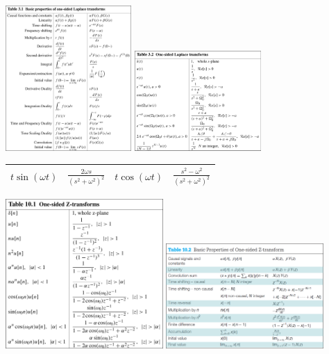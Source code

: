 \documentclass[12pt,landscape,letterpaper]{article}
\begin{document}
\begin{multicols*}{2}
	\includegraphics[width=0.36\textwidth]{laplace-properties}
	\includegraphics[width=0.36\textwidth]{laplace-pairs}
	\begin{tabular}{|c c|c c|}
		\hline
		$t\sin(\omega t)$ & $\frac{2\omega s}{(s^2 + \omega ^2)^2}$ & $t\cos(\omega t)$ & $\frac{s^2 - \omega ^2}{(s^2 + \omega ^2)^2}$\\
		\hline
	\end{tabular}
	\includegraphics[width=0.45\textwidth]{zXform-pairs}
	\includegraphics[width=0.45\textwidth]{zXform-props}

\end{multicols*}
\end{document}
